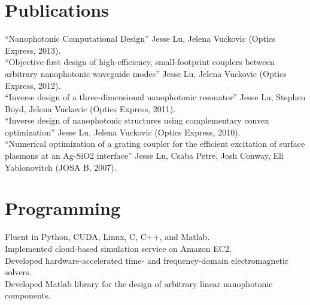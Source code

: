 \documentclass{res}
\begin{document}
\begin{resume}
\section{Publications}          
    ``Nanophotonic Computational Design'' Jesse Lu, Jelena Vuckovic (Optics Express, 2013). \\
    ``Objective-first design of high-efficiency, small-footprint couplers between arbitrary nanophotonic waveguide modes'' Jesse Lu, Jelena Vuckovic (Optics Express, 2012). \\
    ``Inverse design of a three-dimensional nanophotonic resonator'' Jesse Lu, Stephen Boyd, Jelena Vuckovic (Optics Express, 2011). \\
    ``Inverse design of nanophotonic structures using complementary convex optimization'' Jesse Lu, Jelena Vuckovic (Optics Express, 2010). \\
    ``Numerical optimization of a grating coupler for the efficient excitation of surface plasmons at an Ag-SiO2 interface'' Jesse Lu, Csaba Petre, Josh Conway, Eli Yablonovitch (JOSA B, 2007).
  
\section{Programming}          
    Fluent in Python, CUDA, Linux, C, C++, and Matlab. \\
    Implemented cloud-based simulation service on Amazon EC2. \\
    Developed hardware-accelerated time- and frequency-domain
        electromagnetic solvers. \\
    Developed Matlab library for the design of arbitrary linear nanophotonic components.


\end{resume}
\end{document}
